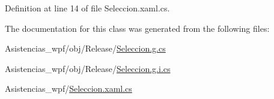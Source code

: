 Definition at line 14 of file Seleccion.\-xaml.\-cs.



The documentation for this class was generated from the following files\-:\begin{DoxyCompactItemize}
\item 
Asistencias\-\_\-wpf/obj/\-Release/\hyperlink{_seleccion_8g_8cs}{Seleccion.\-g.\-cs}\item 
Asistencias\-\_\-wpf/obj/\-Release/\hyperlink{_seleccion_8g_8i_8cs}{Seleccion.\-g.\-i.\-cs}\item 
Asistencias\-\_\-wpf/\hyperlink{_seleccion_8xaml_8cs}{Seleccion.\-xaml.\-cs}\end{DoxyCompactItemize}
